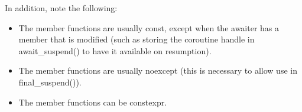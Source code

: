In addition, note the following:

\begin{itemize}
\item 
The member functions are usually const, except when the awaiter has a member that is modified (such as storing the coroutine handle in await\_suspend() to have it available on resumption).

\item 
The member functions are usually noexcept (this is necessary to allow use in final\_suspend()).

\item 
The member functions can be constexpr.
\end{itemize}














